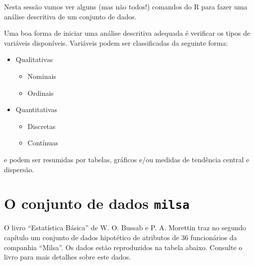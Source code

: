 \documentclass[
  10pt,
  a4paper]{book}
\providecommand{\tightlist}{%
  \setlength{\itemsep}{0pt}\setlength{\parskip}{0pt}}
\begin{document}
Nesta sessão vamos ver alguns (mas não todos!) comandos do R para fazer
uma análise descritiva de um conjunto de dados.

Uma boa forma de iniciar uma análise descritiva adequada é verificar os
tipos de variáveis disponíveis. Variáveis podem ser classificadas da
seguinte forma:

\begin{itemize}
\tightlist
\item
  Qualitativas

  \begin{itemize}
  \tightlist
  \item
    Nominais
  \item
    Ordinais
  \end{itemize}
\item
  Quantitativas

  \begin{itemize}
  \tightlist
  \item
    Discretas
  \item
    Contínuas
  \end{itemize}
\end{itemize}

e podem ser resumidas por tabelas, gráficos e/ou medidas de tendência central e dispersão.

\hypertarget{o-conjunto-de-dados-milsa}{%
\section{\texorpdfstring{O conjunto de dados \texttt{milsa}}{O conjunto de dados milsa}}\label{o-conjunto-de-dados-milsa}}

O livro ``Estatística Básica'' de W. O. Bussab e P. A. Morettin traz no
segundo capítulo um conjunto de dados hipotético de atributos de 36
funcionários da companhia ``Milsa''. Os dados estão reproduzidos na tabela
abaixo. Consulte o livro para mais detalhes sobre este dados.
\end{document}
